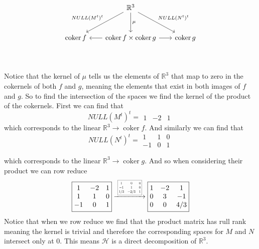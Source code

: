 \documentclass[12pt]{amsart}
\theoremstyle{definition}
\newcommand{\R}{\mathbb{R}}
\DeclareMathOperator{\coker}{\mathrm{coker}}
\newcommand{\ra}{\rightarrow}
\begin{document}
\begin{enumerate}[start=0]
\[\begin{tikzcd}[row sep=1cm, column sep=.65cm]
     &\R^3\arrow[dl, "NULL(M^t)^t"']\arrow[dr, "NULL(N^t)^t"]\arrow[d,"\mu"]&\\
     \coker f& \coker f \times \coker g\arrow[l]\arrow[r] & \coker g\\
    \end{tikzcd}\]

    Notice that the kernel of $\mu$ tells us the elements of $\R^3$ that map to zero in the cokernels of both $f$ and $g$, meaning the elements that exist in both images of $f$ and $g$. So to find the intersection of the spaces we find the kernel of the product of the cokernels. First we can find that
    $$NULL(M^t)^t=\boxed{\begin{matrix}
    1 & -2 & 1
\end{matrix}}$$
which corresponds to the linear $\R^3\ra \coker f$. And similarly we can find that
    $$NULL(N^t)^t=\boxed{\begin{matrix}
    1 & 1 & 0\\
    -1 & 0 & 1
\end{matrix}}$$

which corresponds to the linear $\R^3\ra \coker g$. And so when considering their product we can row reduce
$$\boxed{\begin{matrix}
    1 & -2 & 1\\
    1 & 1 & 0\\
    -1 & 0 & 1
\end{matrix}}
\xrightarrow{\scalebox{0.5}{\;
\boxed{\begin{matrix}
    1 & 0 & 0\\
    -1 & 1 & 0\\
    1/3 & -2/3 & 1
\end{matrix}}\;}}
\boxed{\begin{matrix}
    1 & -2 & 1\\
    0 & 3 & -1\\
    0 & 0 & 4/3
\end{matrix}}$$
Notice that when we row reduce we find that the product matrix has rull rank meaning the kernel is trivial and therefore the corresponding spaces for $M$ and $N$ intersect only at $0$. This means $\mathcal{H}$ is a direct decomposition of $\R^3$.
    
\end{enumerate}
\end{document}
